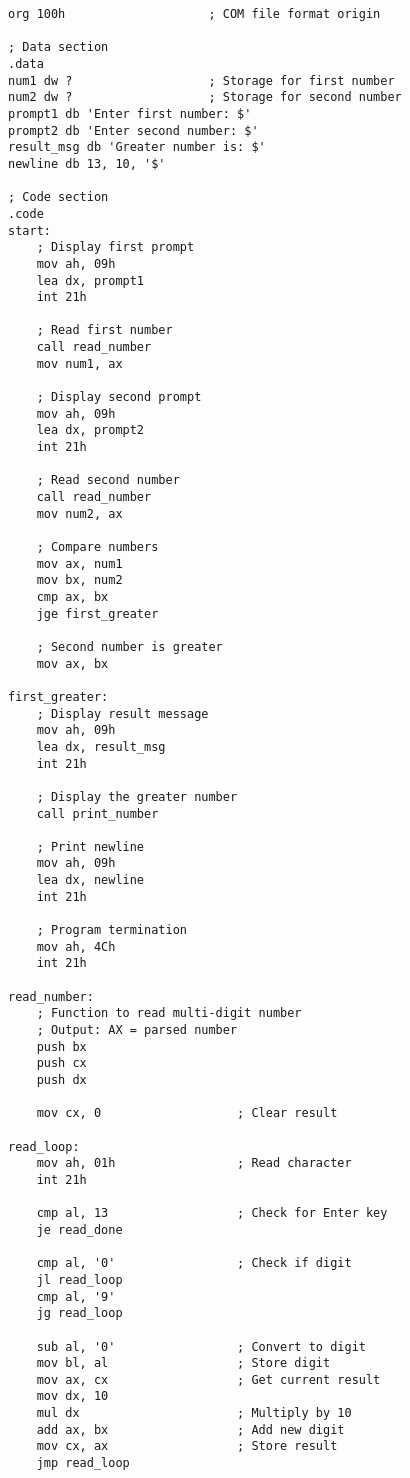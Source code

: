 \documentclass[12pt,a4paper]{article}
\begin{document}
\begin{lstlisting}[caption=16-bit Greater Number Program with Multi-Digit Support]
org 100h                    ; COM file format origin

; Data section
.data
num1 dw ?                   ; Storage for first number
num2 dw ?                   ; Storage for second number
prompt1 db 'Enter first number: $'
prompt2 db 'Enter second number: $'
result_msg db 'Greater number is: $'
newline db 13, 10, '$'

; Code section
.code
start:
    ; Display first prompt
    mov ah, 09h
    lea dx, prompt1
    int 21h
    
    ; Read first number
    call read_number
    mov num1, ax
    
    ; Display second prompt
    mov ah, 09h
    lea dx, prompt2
    int 21h
    
    ; Read second number
    call read_number
    mov num2, ax
    
    ; Compare numbers
    mov ax, num1
    mov bx, num2
    cmp ax, bx
    jge first_greater
    
    ; Second number is greater
    mov ax, bx
    
first_greater:
    ; Display result message
    mov ah, 09h
    lea dx, result_msg
    int 21h
    
    ; Display the greater number
    call print_number
    
    ; Print newline
    mov ah, 09h
    lea dx, newline
    int 21h
    
    ; Program termination
    mov ah, 4Ch
    int 21h

read_number:
    ; Function to read multi-digit number
    ; Output: AX = parsed number
    push bx
    push cx
    push dx
    
    mov cx, 0                   ; Clear result
    
read_loop:
    mov ah, 01h                 ; Read character
    int 21h
    
    cmp al, 13                  ; Check for Enter key
    je read_done
    
    cmp al, '0'                 ; Check if digit
    jl read_loop
    cmp al, '9'
    jg read_loop
    
    sub al, '0'                 ; Convert to digit
    mov bl, al                  ; Store digit
    mov ax, cx                  ; Get current result
    mov dx, 10
    mul dx                      ; Multiply by 10
    add ax, bx                  ; Add new digit
    mov cx, ax                  ; Store result
    jmp read_loop


\end{lstlisting}
\end{document}
